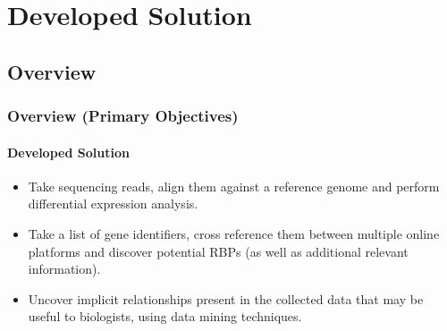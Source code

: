 \documentclass[xcolor=dvipsnames]{beamer}
\begin{document}
\begin{frame}

\end{frame}


\section{Developed Solution}
\subsection{Overview}
\begin{frame}[allowframebreaks]
  \frametitle{Overview (Primary Objectives)}
  \framesubtitle{Developed Solution}

\begin{itemize}
\item
Take sequencing reads, align them against a reference genome and
perform differential expression analysis.\\ \vspace{0.8cm}

\item
Take a list of gene identifiers, cross reference them between multiple online
platforms and discover potential RBPs (as well as additional relevant
information).\\ \vspace{0.8cm}

\item
Uncover implicit relationships present in the collected data that may be useful
to biologists, using data mining techniques.
\end{itemize}
\end{frame}
\end{document}
